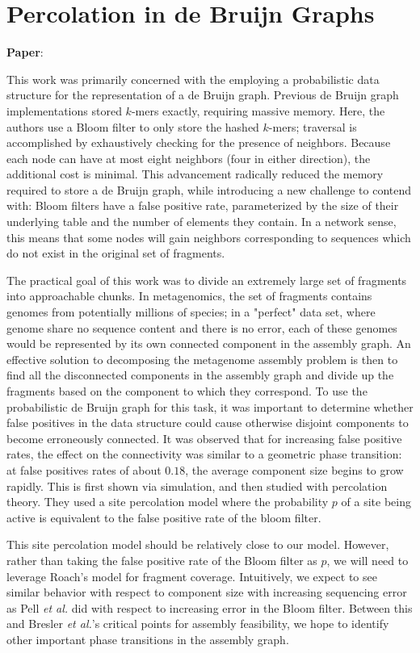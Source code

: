 \documentclass[]{article}
\begin{document}
\section{Percolation in de Bruijn Graphs}
\textbf{Paper}: 

This work was primarily concerned with the employing a probabilistic data structure
for the representation of a de Bruijn graph. Previous de Bruijn graph implementations 
stored $k$-mers exactly, requiring massive memory. Here, the authors use a Bloom
filter \cite{broder_network_2004} to only store the hashed $k$-mers; traversal is 
accomplished by exhaustively checking for the presence of neighbors. Because each node 
can have at most eight neighbors (four in either direction), the additional cost is 
minimal. This advancement radically reduced the memory required to store a de Bruijn 
graph, while introducing a new challenge to contend with: Bloom filters have a false 
positive rate, parameterized by the size of their underlying table and the number of 
elements they contain. In a network sense, this means that some nodes will gain neighbors
corresponding to sequences which do not exist in the original set of fragments.

The practical goal of this work was to divide an extremely large set of fragments into 
approachable chunks. In metagenomics, the set of fragments contains genomes from 
potentially millions of species; in a "perfect" data set, where genome share no sequence 
content and there is no error, each of these genomes would be represented by its own 
connected component in the assembly graph. An effective solution to decomposing the 
metagenome assembly problem is then to find all the disconnected components in the 
assembly graph and divide up the fragments based on the component to which they 
correspond. 
To use the probabilistic de Bruijn graph for this task, it was important to determine 
whether false positives in the data structure could cause otherwise disjoint components 
to become erroneously connected. It was observed that for increasing false positive 
rates, the effect on the connectivity was similar to a geometric phase transition: at 
false positives rates of about $0.18$, the average component size begins to grow rapidly. 
This is first shown via simulation, and then studied with percolation theory. They used a 
site percolation model where the probability $p$ of a site being active is equivalent to 
the false positive rate of the bloom filter.

This site percolation model should be relatively close to our model. However, rather than
taking the false positive rate of the Bloom filter as $p$, we will need to leverage
Roach's model for fragment coverage. Intuitively, we expect to see similar behavior with 
respect to component size with increasing sequencing error as Pell \emph{et al.} did with 
respect to increasing error in the Bloom filter. Between this and Bresler \emph{et al.}'s 
critical points for assembly feasibility, we hope to identify other important phase 
transitions in the assembly graph.



\end{document}
